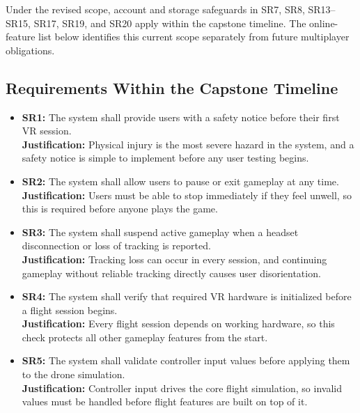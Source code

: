 \documentclass{article}
\newcommand{\reqref}[1]{#1}
\begin{document}
Under the revised scope, account and storage safeguards in \reqref{SR7},
\reqref{SR8}, \reqref{SR13}--\reqref{SR15}, \reqref{SR17}, \reqref{SR19}, and
\reqref{SR20} apply within the capstone timeline. The online-feature list below
identifies this current scope separately from future multiplayer obligations.

\subsection{Requirements Within the Capstone Timeline}

\begin{itemize}
    \item \textbf{\reqref{SR1}:} The system shall provide users with a safety notice before their first VR session.\\
    \textbf{Justification:} Physical injury is the most severe hazard in the system, and a safety notice is simple to implement before any user testing begins.

    \item \textbf{\reqref{SR2}:} The system shall allow users to pause or exit gameplay at any time.\\
    \textbf{Justification:} Users must be able to stop immediately if they feel unwell, so this is required before anyone plays the game.

    \item \textbf{\reqref{SR3}:} The system shall suspend active gameplay when a headset disconnection or loss of tracking is reported.\\
    \textbf{Justification:} Tracking loss can occur in every session, and continuing gameplay without reliable tracking directly causes user disorientation.

    \item \textbf{\reqref{SR4}:} The system shall verify that required VR hardware is initialized before a flight session begins.\\
    \textbf{Justification:} Every flight session depends on working hardware, so this check protects all other gameplay features from the start.

    \item \textbf{\reqref{SR5}:} The system shall validate controller input values before applying them to the drone simulation.\\
    \textbf{Justification:} Controller input drives the core flight simulation, so invalid values must be handled before flight features are built on top of it.


\end{itemize}
\end{document}
